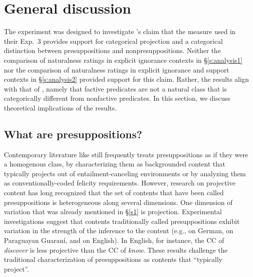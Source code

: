 \documentclass[11pt,fleqn]{article}
\newcommand{\6}{\mbox{$[\hspace*{-.6mm}[$}}
\newcommand{\9}{\mbox{$]\hspace*{-.6mm}]$}}
\newcommand{\citepos}[1]{\citeauthor{#1}'s \citeyear{#1}}
\begin{document}

  
\section{General discussion}\label{s3}

The experiment was designed to investigate \citepos{mandelkern-etal2020} claim that the measure used in their Exp.~3 provides support for categorical  projection and a categorical distinction between presuppositions and nonpresuppositions. Neither the comparison of naturalness ratings in explicit ignorance contexts  in \S\ref{s:analysis1} nor the comparison of naturalness ratings in explicit ignorance and support contexts in \S\ref{s:analysis2} provided support for this claim. Rather, the results align with that of \citealt{degen-tonhauser-language}, namely that factive predicates are not a natural class that is categorically different from nonfactive predicates. In this section, we discuss theoretical implications of the results.

\subsection{What are presuppositions?}\label{s31}

Contemporary literature like \citealt{mandelkern-etal2020} still frequently treats presuppositions as if they were a homogenous class, by characterizing them as backgrounded content that typically projects out of entailment-canceling environments or by analyzing them as conventionally-coded felicity requirements. However, research on projective content has long recognized that the set of contents that have been called presuppositions is heterogeneous along several dimensions. One dimension of variation that was already mentioned in \S\ref{s1} is projection. Experimental investigations suggest that contents traditionally called presuppositions exhibit variation in the strength of the inference to the content (e.g., \citealt{xue-onea11} on German, \citealt{tonhauser-guarani-variability} on Paraguayan Guaran\'i, and \citealt{demarneffe-etal-sub23,tbd-variability,degen-tonhauser-language} on English). In English, for instance, the CC of {\em discover} is less projective than the CC of {\em know}. These results challenge the traditional characterization of presuppositions as contents that ``typically project''.
\end{document}
